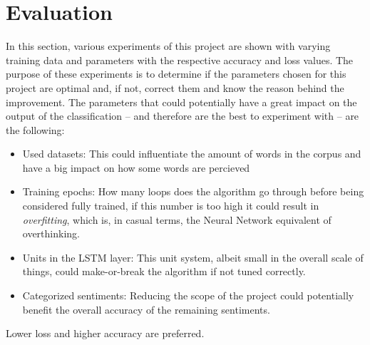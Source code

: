 \documentclass[review]{elsarticle} %
\begin{document}
\section{Evaluation}
In this section, various experiments of this project are shown with varying training data and parameters with the respective accuracy and loss values.
The purpose of these experiments is to determine if the parameters chosen for this project are optimal and, if not, correct them and know the reason behind the improvement.
The parameters that could potentially have a great impact on the output of the classification -- and therefore are the best to experiment with -- are the following:
\begin{itemize}
	\item Used datasets: This could influentiate the amount of words in the corpus and have a big impact on how some words are percieved
	\item Training epochs: How many loops does the algorithm go through before being considered fully trained, if this number is too high it could result in \textit{overfitting}, which is, in casual terms, the Neural Network equivalent of overthinking.
	\item Units in the LSTM layer: This unit system, albeit small in the overall scale of things, could make-or-break the algorithm if not tuned correctly.
	\item Categorized sentiments: Reducing the scope of the project could potentially benefit the overall accuracy of the remaining sentiments.
\end{itemize}

Lower loss and higher accuracy are preferred.
\end{document}

